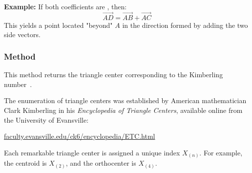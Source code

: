 \medskip
\noindent
\textbf{Example:} If both coefficients are , then:
\[
\overrightarrow{AD} = \overrightarrow{AB} + \overrightarrow{AC}
\]
This yields a point located "beyond" $A$ in the direction formed by adding the two side vectors.

\begin{mybox}
\end{mybox}

\vspace{1em}


\vspace{1em}
\begin{tkzexample}[latex=.5\textwidth]
\begin{center}
\end{center}
\end{tkzexample}



\subsubsection{Method } %
\label{ssub:method_triangle_kimberling_n}

This method returns the triangle center corresponding to the Kimberling number~.

\medskip
\noindent
The enumeration of triangle centers was established by American mathematician Clark Kimberling in his \textit{Encyclopedia of Triangle Centers}, available online from the University of Evansville:
\begin{center}
\href{http://faculty.evansville.edu/ck6/encyclopedia/ETC.html}{faculty.evansville.edu/ck6/encyclopedia/ETC.html}
\end{center}

\noindent
Each remarkable triangle center is assigned a unique index $X_{(n)}$. For example, the centroid is $X_{(2)}$, and the orthocenter is $X_{(4)}$.

